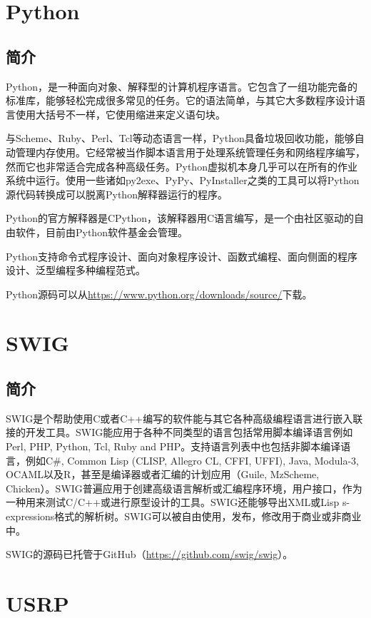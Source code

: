 	\section{Python}
		\subsection{简介}
			\par Python，是一种面向对象、解释型的计算机程序语言。它包含了一组功能完备的标准库，能够轻松完成很多常见的任务。它的语法简单，与其它大多数程序设计语言使用大括号不一样，它使用缩进来定义语句块。
			\par 与Scheme、Ruby、Perl、Tcl等动态语言一样，Python具备垃圾回收功能，能够自动管理内存使用。它经常被当作脚本语言用于处理系统管理任务和网络程序编写，然而它也非常适合完成各种高级任务。Python虚拟机本身几乎可以在所有的作业系统中运行。使用一些诸如py2exe、PyPy、PyInstaller之类的工具可以将Python源代码转换成可以脱离Python解释器运行的程序。
			\par Python的官方解释器是CPython，该解释器用C语言编写，是一个由社区驱动的自由软件，目前由Python软件基金会管理。
			\par Python支持命令式程序设计、面向对象程序设计、函数式编程、面向侧面的程序设计、泛型编程多种编程范式。\cite{ wiki:Python}
			\par Python源码可以从\href{https://www.python.org/downloads/source/}{https://www.python.org/downloads/source/}下载。
	\section{SWIG}
		\subsection{简介}
			\par SWIG是个帮助使用C或者C++编写的软件能与其它各种高级编程语言进行嵌入联接的开发工具。SWIG能应用于各种不同类型的语言包括常用脚本编译语言例如Perl, PHP, Python, Tcl, Ruby and PHP。支持语言列表中也包括非脚本编译语言，例如C\#, Common Lisp (CLISP, Allegro CL, CFFI, UFFI), Java, Modula-3, OCAML以及R，甚至是编译器或者汇编的计划应用（Guile, MzScheme, Chicken）。SWIG普遍应用于创建高级语言解析或汇编程序环境，用户接口，作为一种用来测试C/C++或进行原型设计的工具。SWIG还能够导出XML或Lisp s-expressions格式的解析树。SWIG可以被自由使用，发布，修改用于商业或非商业中。\cite{ wiki:SWIG}
			\par SWIG的源码已托管于GitHub（\href{https://github.com/swig/swig}{https://github.com/swig/swig}）。
	\section{USRP}

